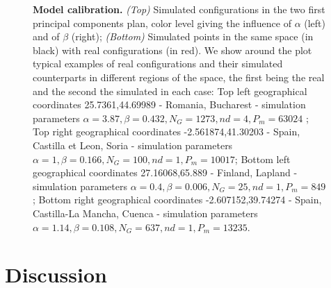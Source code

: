 \documentclass[10pt,letterpaper]{article}
\begin{document}


\begin{figure}
\caption{\textbf{Model calibration.} \textit{(Top)} Simulated configurations in the two first principal components plan, color level giving the influence of $\alpha$ (left) and of $\beta$ (right); \textit{(Bottom)} Simulated points in the same space (in black) with real configurations (in red). We show around the plot typical examples of real configurations and their simulated counterparts in different regions of the space, the first being the real and the second the simulated in each case: Top left geographical coordinates 25.7361,44.69989 - Romania, Bucharest - simulation parameters $\alpha=3.87,\beta=0.432,N_G=1273,nd=4,P_m=63024$ ; Top right geographical coordinates -2.561874,41.30203 - Spain, Castilla et Leon, Soria - simulation parameters $\alpha=1,\beta=0.166,N_G=100,nd=1,P_m=10017$; Bottom left geographical coordinates 27.16068,65.889 - Finland, Lapland - simulation parameters $\alpha=0.4,\beta=0.006,N_G=25,nd=1,P_m=849$; Bottom right geographical coordinates -2.607152,39.74274 - Spain, Castilla-La Mancha, Cuenca - simulation parameters $\alpha=1.14,\beta=0.108,N_G=637,nd=1,P_m=13235$.}
\label{fig:densitycalib}
\end{figure}







\section*{Discussion}
\end{document}

